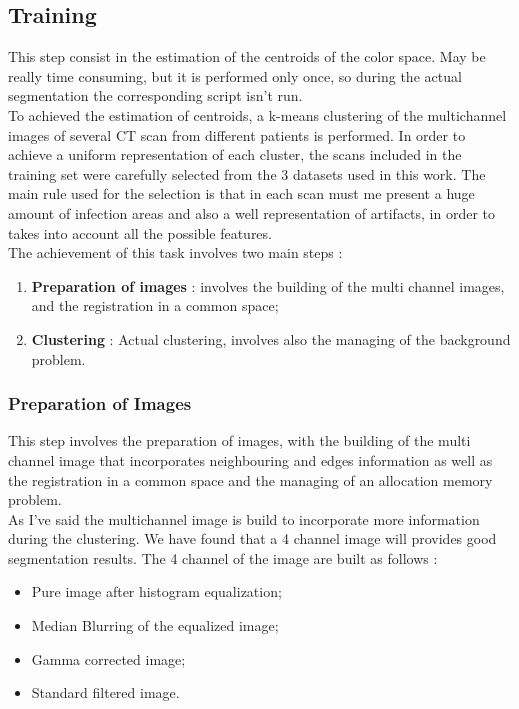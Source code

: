 
	
	\subsection{Training}
	
	This step consist in the estimation of the centroids of the color space. May be  really time consuming, but it is performed only once, so during the actual segmentation the corresponding script isn't run.\\
	To achieved the estimation of centroids, a k-means clustering of the multichannel images of several CT scan from different patients is performed. 
	In order to achieve a uniform representation of each cluster, the scans included in the training set were carefully selected from the $3$ datasets used in this work. The main rule used for the selection is that in each scan must me present a huge amount of infection areas and also a well representation of artifacts, in order to takes into account all the possible features.\\
	The achievement of this task involves two main steps : 
	\begin{enumerate}
		\item \textbf{Preparation of images} : involves the building of the multi channel images, and the registration in a common space; 
		
		\item \textbf{Clustering} : Actual clustering, involves also the managing of the background problem.
	\end{enumerate}

		\subsubsection*{Preparation of Images} 
	
		This step involves the preparation of images, with the building of the multi channel image that incorporates neighbouring and edges information as well as the registration in a common space and the managing of an allocation memory problem.\\
			
		As I've said the multichannel image is build to incorporate more information during the clustering. We have found that a 4 channel image will provides good segmentation results. The 4 channel of the image are built as follows  : 
		\begin{itemize}
			\item Pure image after histogram equalization; 
			\item Median Blurring of the equalized image; 
			\item Gamma corrected image;
			\item Standard filtered image.
		\end{itemize}
	
